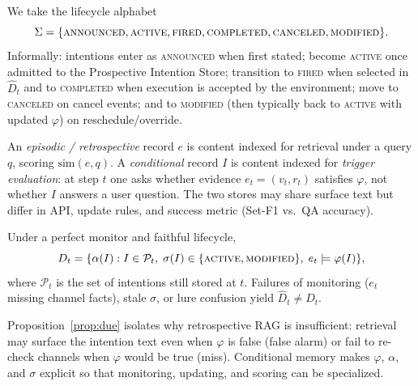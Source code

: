 We take the lifecycle alphabet
\[
\Sigma=\{\textsc{announced},\textsc{active},\textsc{fired},\textsc{completed},\textsc{canceled},\textsc{modified}\}.
\]
Informally: intentions enter as \textsc{announced} when first stated; become \textsc{active} once admitted to the Prospective Intention Store; transition to \textsc{fired} when selected in $\hat{D}_t$ and to \textsc{completed} when execution is accepted by the environment; move to \textsc{canceled} on cancel events; and to \textsc{modified} (then typically back to \textsc{active} with updated $\varphi$) on reschedule/override.

\begin{definition}
\label{def:vs-episodic}
An \emph{episodic / retrospective} record $e$ is content indexed for retrieval under a query $q$, scoring $\mathrm{sim}(e,q)$. A \emph{conditional} record $I$ is content indexed for \emph{trigger evaluation}: at step $t$ one asks whether evidence $e_t=(v_t,r_t)$ satisfies $\varphi$, not whether $I$ answers a user question. The two stores may share surface text but differ in API, update rules, and success metric (Set-F1 vs.\ QA accuracy).
\end{definition}

\begin{proposition}
\label{prop:due}
Under a perfect monitor and faithful lifecycle, 
\[
D_t = \{\alpha(I) : I\in\mathcal{P}_t,\;\sigma(I)\in\{\textsc{active},\textsc{modified}\},\; e_t\models\varphi(I)\},
\]
where $\mathcal{P}_t$ is the set of intentions still stored at $t$. Failures of monitoring ($e_t$ missing channel facts), stale $\sigma$, or lure confusion yield $\hat{D}_t\neq D_t$.
\end{proposition}

Proposition~\ref{prop:due} isolates why retrospective RAG is insufficient: retrieval may surface the intention text even when $\varphi$ is false (false alarm) or fail to re-check channels when $\varphi$ would be true (miss). Conditional memory makes $\varphi$, $\alpha$, and $\sigma$ explicit so that monitoring, updating, and scoring can be specialized.
